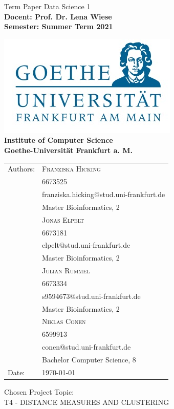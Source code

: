 \documentclass[12pt, english]
{article}
\begin{document}
\begin{titlepage}

\begin{center}

{\Huge {
Term Paper Data Science 1}
}
\\[2ex]

\textbf{
\Large 
Docent: Prof. Dr. Lena Wiese \\ 
Semester: Summer Term 2021\\  
}



\includegraphics[scale=0.4]{logo.jpg} \\ 
\large{\textbf{Institute of Computer Science \\ Goethe-Universit\"at Frankfurt a. M.}}



\begin{tabular}{ll}
Authors: & \textsc{Franziska Hicking} \\
& {\small 6673525} \\
& {\small franziska.hicking@stud.uni-frankfurt.de} \\
& {\small Master Bioinformatics, 2} \\
& \textsc{Jonas Elpelt} \\
& {\small 6673181}\\
&{\small  elpelt@stud.uni-frankfurt.de}\\
& {\small Master Bioinformatics, 2} \\
& \textsc{Julian Rummel} \\
&{\small  6673334}\\
& {\small s9594673@stud.uni-frankfurt.de}\\
&{\small  Master Bioinformatics, 2} \\
& \textsc{Niklas Conen}\\
& {\small 6599913}\\
& {\small conen@stud.uni-frankfurt.de}\\
& {\small Bachelor Computer Science, 8}\\
Date: & \today \\		
\end{tabular}

\end{center}

\vspace*{\fill}

\large
\noindent{}Chosen Project Topic: \\
T4 - DISTANCE MEASURES AND CLUSTERING


\end{titlepage}
\end{document}
